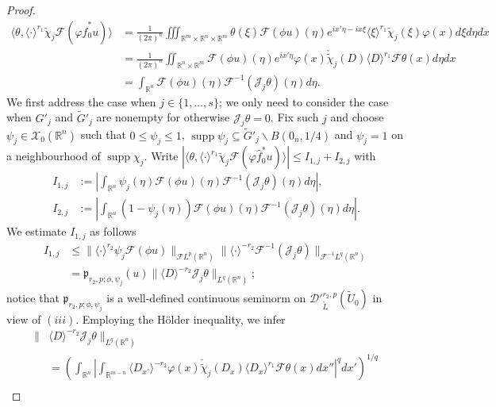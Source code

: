 \documentclass[12pt,reqno]{amsart}
\newcommand{\RR}{\mathbb R}
\newcommand{\DD}{\mathcal D}
\newcommand{\XX}{\mathcal X}
\newcommand{\supp}{\operatorname{supp}}
\theoremstyle{plain}
\theoremstyle{remark}
\theoremstyle{definition}
\numberwithin{equation}{section}
\begin{document}
\begin{proof}
\begin{align}
\langle \theta,\langle\cdot\rangle^{r_1}\widetilde{\chi}_j\mathcal{F}(\varphi \hat{f}_0^*u)\rangle&=\frac{1}{(2\pi)^n}\iiint_{\RR^m\times\RR^n\times\RR^m} \theta(\xi)\mathcal{F}(\phi u)(\eta)e^{ix'\eta-ix\xi}\langle \xi\rangle^{r_1}\widetilde{\chi}_j(\xi)\varphi(x)d\xi d\eta dx\nonumber\\
&=\frac{1}{(2\pi)^n}\iint_{\RR^n\times\RR^m}\mathcal{F}(\phi u)(\eta)e^{ix'\eta}\varphi(x)\check{\widetilde{\chi}}_j(D)\langle D\rangle^{r_1}\mathcal{F}\theta(x)d\eta dx\label{exp-for-actonsplintskl}\\
&=\int_{\RR^n}\mathcal{F}(\phi u)(\eta)\mathcal{F}^{-1}(\mathcal{J}_j\theta)(\eta)d\eta.\label{exp-for-pai-ofdualityformainskl}
\end{align}
We first address the case when $j\in\{1,\ldots,s\}$; we only need to consider the case when $G'_j$ and $\widetilde{G}'_j$ are nonempty for otherwise $\mathcal{J}_j\theta=0$. Fix such $j$ and choose $\psi_j\in\XX_0(\RR^n)$ such that $0\leq \psi_j\leq 1$, $\supp\psi_j\subseteq \widetilde{G}'_j\backslash B(0_n,1/4)$ and $\psi_j=1$ on a neighbourhood of $\supp\chi_j$. Write $|\langle \theta,\langle\cdot\rangle^{r_1}\widetilde{\chi}_j\mathcal{F}(\varphi \hat{f}_0^*u)\rangle|\leq I_{1,j}+I_{2,j}$ with
\begin{align*}
I_{1,j}&:=\left|\int_{\RR^n}\psi_j(\eta)\mathcal{F}(\phi u)(\eta)\mathcal{F}^{-1}(\mathcal{J}_j\theta)(\eta)d\eta \right|,\\
I_{2,j}&:=\left|\int_{\RR^n}(1-\psi_j(\eta))\mathcal{F}(\phi u)(\eta)\mathcal{F}^{-1}(\mathcal{J}_j\theta)(\eta)d\eta\right|.
\end{align*}
We estimate $I_{1,j}$ as follows
\begin{align*}
I_{1,j}&\leq \|\langle\cdot\rangle^{r_2}\psi_j\mathcal{F}(\phi u)\|_{\mathcal{F}L^p(\RR^n)} \|\langle\cdot\rangle^{-r_2}\mathcal{F}^{-1}(\mathcal{J}_j\theta)\|_{\mathcal{F}^{-1}L^q(\RR^n)}\\
&=\mathfrak{p}_{r_2,p;\phi,\psi_j}(u)\|\langle D\rangle^{-r_2}\mathcal{J}_j\theta\|_{L^q(\RR^n)};
\end{align*}
notice that $\mathfrak{p}_{r_2,p;\phi,\psi_j}$ is a well-defined continuous seminorm on $\DD'^{r_2,p}_{\widetilde{L}}(\widetilde{U}_0)$ in view of $(iii)$. Employing the H\"older inequality, we infer
\begin{align}
\|&\langle D\rangle^{-r_2}\mathcal{J}_j\theta\|_{L^q(\RR^n)}\nonumber\\
&= \left(\int_{\RR^n}\left|\int_{\RR^{m-n}}\langle D_{x'}\rangle^{-r_2}\varphi(x)\check{\widetilde{\chi}}_j(D_x)\langle D_x\rangle^{r_1}\mathcal{F}\theta(x)dx''\right|^qdx'\right)^{1/q}\nonumber\\

\end{align}
\end{proof}
\end{document}
